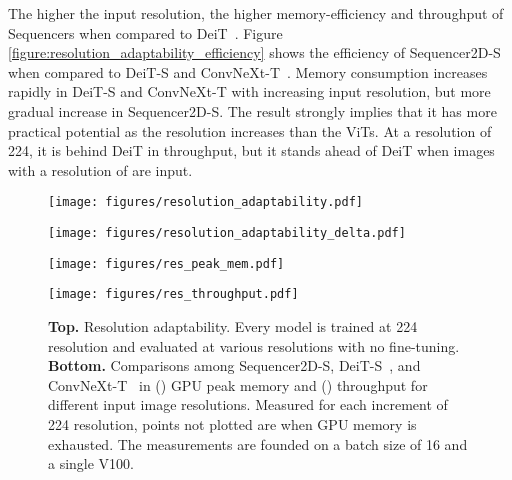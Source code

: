 \documentclass{article}
\begin{document}
The higher the input resolution, the higher memory-efficiency and throughput of Sequencers when compared to DeiT~\cite{touvron2020training}. Figure \ref{figure:resolution_adaptability_efficiency} shows the efficiency of Sequencer2D-S when compared to DeiT-S and ConvNeXt-T~\cite{liu2022convnet}. Memory consumption increases rapidly in DeiT-S and ConvNeXt-T with increasing input resolution, but more gradual increase in Sequencer2D-S. The result strongly implies that it has more practical potential as the resolution increases than the ViTs. At a resolution of 224, it is behind DeiT in throughput, but it stands ahead of DeiT when images with a resolution of  are input.

\begin{figure}[ht]
\centering
\begin{minipage}[t]{0.75\textwidth}
\vspace{0pt}
\addtolength{\tabcolsep}{-1pt}
\captionsetup{width=0.92\textwidth}
\small
  \centering
  \begin{minipage}[b]{0.49\hsize}
    \centering
    \texttt{[image: figures/resolution\_adaptability.pdf]}
    \label{figure:resolution_adaptability_org}
  \end{minipage}
  \begin{minipage}[b]{0.49\hsize}
    \centering
    \texttt{[image: figures/resolution\_adaptability\_delta.pdf]}
    \label{figure:resolution_adaptability_delta}
  \end{minipage}
  \centering
    \begin{minipage}[b]{0.49\hsize}
    \centering
    \texttt{[image: figures/res\_peak\_mem.pdf]}
    \label{figure:efficiency_peak_memory}
  \end{minipage}
  \begin{minipage}[b]{0.49\hsize}
    \centering
    \texttt{[image: figures/res\_throughput.pdf]}
    \label{figure:efficiency_throughput}
  \end{minipage}
    \caption{\textbf{Top.} Resolution adaptability. Every model is trained at 224 resolution and evaluated at various resolutions with no fine-tuning. \textbf{Bottom.} Comparisons among Sequencer2D-S, DeiT-S~\cite{touvron2020training}, and ConvNeXt-T~\cite{liu2022convnet} in () GPU peak memory and () throughput for different input image resolutions. Measured for each increment of 224 resolution, points not plotted are when GPU memory is exhausted. The measurements are founded on a batch size of 16 and a single V100.}

\end{minipage}
\end{figure}
\end{document}
